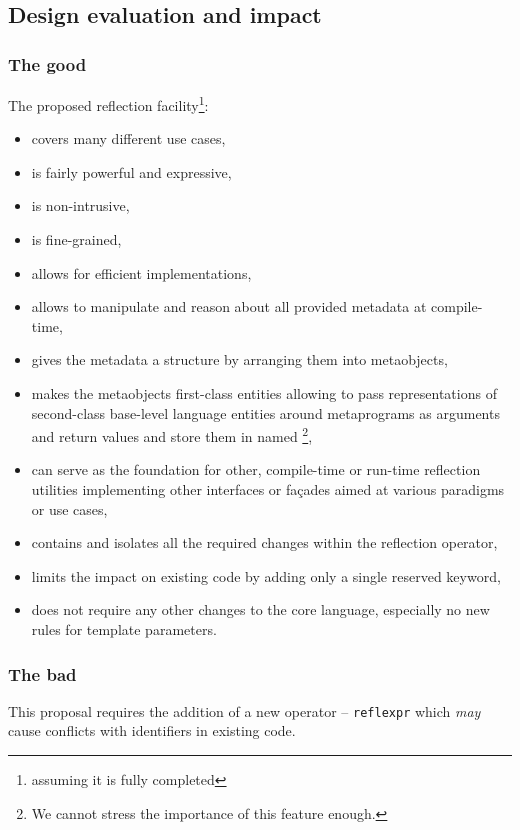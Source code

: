 \subsection{Design evaluation and impact}

\subsubsection{The good}

The proposed reflection facility\footnote{assuming it is fully completed}:

\begin{itemize}
\item covers many different use cases,
\item is fairly powerful and expressive,
\item is non-intrusive,
\item is fine-grained,
\item allows for efficient implementations,
\item allows to manipulate and reason about all provided metadata at compile-time,
\item gives the metadata a structure by arranging them into metaobjects,
\item makes the metaobjects first-class entities allowing to pass
	representations of second-class base-level language entities
	around metaprograms as arguments and return values and store them
	in named \footnote{We cannot stress the importance of this
	feature enough.},
\item can serve as the foundation for other, compile-time or run-time reflection
	utilities implementing other interfaces or fa\c{c}ades aimed at various
	paradigms or use cases,
\item contains and isolates all the required changes within the reflection operator,
\item limits the impact on existing code by adding only a single reserved keyword,
\item does not require any other changes to the core language, especially no new rules
	for template parameters.
\end{itemize}

\subsubsection{The bad}

This proposal requires the addition of a new operator -- \texttt{reflexpr}
which {\em may} cause conflicts with identifiers in existing code.


